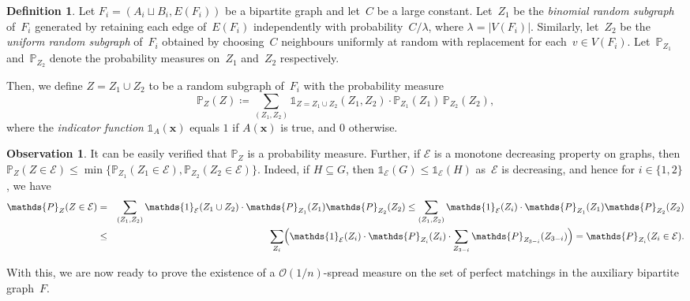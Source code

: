 \documentclass[final]{article}
\theoremstyle{definition}
\newtheorem{definition}[theorem]{Definition}
\newtheorem{obs}[theorem]{Observation}
\begin{document}
\begin{definition}
    \label{defn:coupled_measure}
    Let $F_i = (A_i \sqcup B_i, E(F_i))$ be a bipartite graph and let~$C$ be a large constant. Let~$Z_1$ be the \emph{binomial random subgraph} of~$F_i$ generated by retaining each edge of~$E(F_i)$ independently with probability~$C/\lambda$, where $\lambda = |V(F_i)|$. Similarly, let~$Z_2$ be the \emph{uniform random subgraph} of~$F_i$ obtained by choosing~$C$ neighbours uniformly at random with replacement for each~$v \in V(F_i)$. Let~$\mathds{P}_{Z_1}$ and~$\mathds{P}_{Z_2}$ denote the probability measures on~$Z_1$ and~$Z_2$ respectively. 
    
    Then, we define $Z = Z_1 \cup Z_2$ to be a random subgraph of~$F_i$ with the probability measure 
    $$ \mathds{P}_Z(Z) \coloneqq \sum_{(Z_1, Z_2)} \mathds{1}_{Z = Z_1 \cup Z_2}(Z_1, Z_2) \cdot  \mathds{P}_{Z_1}(Z_1)\, \mathds{P}_{Z_2}(Z_2),$$ where the \emph{indicator function} $\mathds{1}_A(\mathbf{x})$ equals $1$ if $A(\mathbf{x})$ is true, and $0$ otherwise.
\end{definition} 
\begin{obs}
    \label{obs:coupling_prob}
    It can be easily verified that $\mathds{P}_Z$ is a probability measure. Further, if $\mathcal{E}$ is a monotone decreasing property on graphs, then $\mathds{P}_Z(Z \in \mathcal{E}) \leq \min\big\{ \mathds{P}_{Z_1}(Z_1 \in \mathcal{E}), \mathds{P}_{Z_2}(Z_2 \in \mathcal{E})\big\}$. Indeed, if $H \subseteq G$, then $\mathds{1}_{\mathcal{E}}(G) \leq \mathds{1}_{\mathcal{E}}(H)$ as~$\mathcal{E}$ is decreasing, and hence for $i \in \{1, 2\}$, we have
    \begin{eqnarray*}
        \mathds{P}_Z(Z \in \mathcal{E}) &=& \sum_{(Z_1, Z_2)} \mathds{1}_{\mathcal{E}}(Z_1 \cup Z_2) \cdot  \mathds{P}_{Z_1}(Z_1) \mathds{P}_{Z_2}(Z_2) \leq \sum_{(Z_1, Z_2)} \mathds{1}_{\mathcal{E}}(Z_i) \cdot \mathds{P}_{Z_1}(Z_1) \mathds{P}_{Z_2}(Z_2)\\
        &\leq& \sum_{Z_i} \Bigl(\mathds{1}_{\mathcal{E}}(Z_i) \cdot \mathds{P}_{Z_i}(Z_i)\cdot \sum_{Z_{3-i}} \mathds{P}_{Z_{3-i}}(Z_{3-i})\Bigr) = \mathds{P}_{Z_i}(Z_i \in \mathcal{E}). 
    \end{eqnarray*}   
\end{obs}

With this, we are now ready to prove the existence of a $\mathcal{O}(1/n)$-spread measure on the set of perfect matchings in the auxiliary bipartite graph~$F$.
\end{document}
